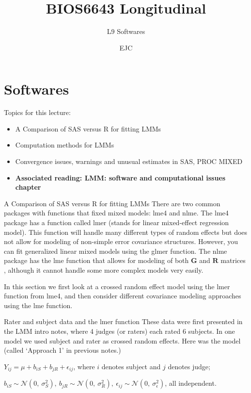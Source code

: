 \documentclass[
  9pt,
  ignorenonframetext,
]{beamer}
\title{BIOS6643 Longitudinal}
\subtitle{L9 Softwares}
\author{EJC}
\date{}
\institute{Department of Biostatistics \& Informatics}
\providecommand{\tightlist}{%
  \setlength{\itemsep}{0pt}\setlength{\parskip}{0pt}}
\begin{document}
\frame{\titlepage}

\begin{frame}[allowframebreaks]
  \tableofcontents[hideallsubsections]
\end{frame}
\hypertarget{softwares}{%
\section{Softwares}\label{softwares}}

\begin{frame}{Topics for this lecture:}
\protect\hypertarget{topics-for-this-lecture}{}
\begin{itemize}
\item
  A Comparison of SAS versus R for fitting LMMs
\item
  Computation methods for LMMs
\item
  Convergence issues, warnings and unusual estimates in SAS, PROC MIXED
\end{itemize}

\vspace{\baselineskip}

\begin{itemize}
\tightlist
\item
  \textbf{Associated reading: LMM: software and computational issues
  chapter}
\end{itemize}
\end{frame}

\begin{frame}{A Comparison of SAS versus R for fitting LMMs}
\protect\hypertarget{a-comparison-of-sas-versus-r-for-fitting-lmms}{}
There are two common packages with functions that fixed mixed models:
lme4 and nlme. The lme4 package has a function called lmer (stands for
linear mixed-effect regression model). This function will handle many
different types of random effects but does not allow for modeling of
non-simple error covariance structures. However, you can fit generalized
linear mixed models using the glmer function. The nlme package has the
lme function that allows for modeling of both \(\pmb G\) and \(\pmb R\)
matrices , although it cannot handle some more complex models very
easily.

In this section we first look at a crossed random effect model using the
lmer function from lme4, and then consider different covariance modeling
approaches using the lme function.
\end{frame}

\begin{frame}{Rater and subject data and the lmer function}
\protect\hypertarget{rater-and-subject-data-and-the-lmer-function}{}
These data were first presented in the LMM intro notes, where 4 judges
(or raters) each rated 6 subjects. In one model we used subject and
rater as crossed random effects. Here was the model (called `Approach 1'
in previous notes.)

\(Y_{ij}=\mu +b_{iS}+b_{jR}+\epsilon_{ij}\), where \(i\) denotes subject
and \(j\) denotes judge;

\(b_{iS} \sim \mathcal N(0,\  \sigma_S^2),\ b_{jR} \sim \mathcal N(0,\  \sigma_R^2),\ \epsilon_{ij} \sim \mathcal N(0,\  \sigma_\epsilon^2)\),
all independent.
\end{frame}
\end{document}
